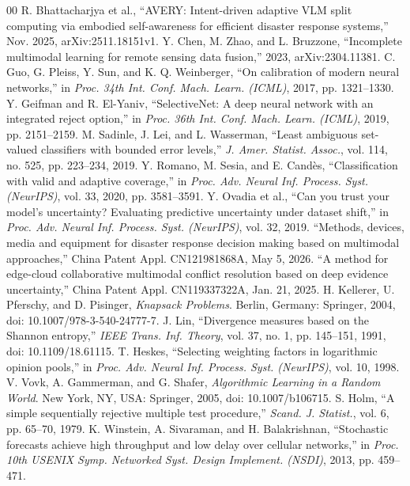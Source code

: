 \documentclass[conference,a4paper]{IEEEtran}
\begin{document}
\begin{thebibliography}{00}
R. Bhattacharjya et al., ``AVERY: Intent-driven adaptive VLM split computing via embodied self-awareness for efficient disaster response systems,'' Nov. 2025, arXiv:2511.18151v1.
Y. Chen, M. Zhao, and L. Bruzzone, ``Incomplete multimodal learning for remote sensing data fusion,'' 2023, arXiv:2304.11381.
C. Guo, G. Pleiss, Y. Sun, and K. Q. Weinberger, ``On calibration of modern neural networks,'' in \emph{Proc. 34th Int. Conf. Mach. Learn. (ICML)}, 2017, pp. 1321--1330.
Y. Geifman and R. El-Yaniv, ``SelectiveNet: A deep neural network with an integrated reject option,'' in \emph{Proc. 36th Int. Conf. Mach. Learn. (ICML)}, 2019, pp. 2151--2159.
M. Sadinle, J. Lei, and L. Wasserman, ``Least ambiguous set-valued classifiers with bounded error levels,'' \emph{J. Amer. Statist. Assoc.}, vol. 114, no. 525, pp. 223--234, 2019.
Y. Romano, M. Sesia, and E. Cand\`es, ``Classification with valid and adaptive coverage,'' in \emph{Proc. Adv. Neural Inf. Process. Syst. (NeurIPS)}, vol. 33, 2020, pp. 3581--3591.
Y. Ovadia et al., ``Can you trust your model's uncertainty? Evaluating predictive uncertainty under dataset shift,'' in \emph{Proc. Adv. Neural Inf. Process. Syst. (NeurIPS)}, vol. 32, 2019.
``Methods, devices, media and equipment for disaster response decision making based on multimodal approaches,'' China Patent Appl. CN121981868A, May 5, 2026.
``A method for edge-cloud collaborative multimodal conflict resolution based on deep evidence uncertainty,'' China Patent Appl. CN119337322A, Jan. 21, 2025.
H. Kellerer, U. Pferschy, and D. Pisinger, \emph{Knapsack Problems}. Berlin, Germany: Springer, 2004, doi: 10.1007/978-3-540-24777-7.
J. Lin, ``Divergence measures based on the Shannon entropy,'' \emph{IEEE Trans. Inf. Theory}, vol. 37, no. 1, pp. 145--151, 1991, doi: 10.1109/18.61115.
T. Heskes, ``Selecting weighting factors in logarithmic opinion pools,'' in \emph{Proc. Adv. Neural Inf. Process. Syst. (NeurIPS)}, vol. 10, 1998.
V. Vovk, A. Gammerman, and G. Shafer, \emph{Algorithmic Learning in a Random World}. New York, NY, USA: Springer, 2005, doi: 10.1007/b106715.
S. Holm, ``A simple sequentially rejective multiple test procedure,'' \emph{Scand. J. Statist.}, vol. 6, pp. 65--70, 1979.
K. Winstein, A. Sivaraman, and H. Balakrishnan, ``Stochastic forecasts achieve high throughput and low delay over cellular networks,'' in \emph{Proc. 10th USENIX Symp. Networked Syst. Design Implement. (NSDI)}, 2013, pp. 459--471.

\end{thebibliography}
\end{document}
